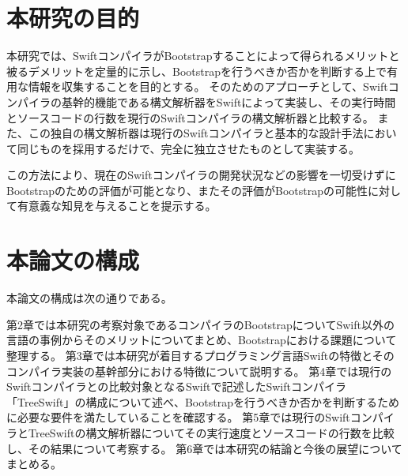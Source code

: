 \section{本研究の目的}
\label{introduction:purpose}

本研究では、SwiftコンパイラがBootstrapすることによって得られるメリットと被るデメリットを定量的に示し、Bootstrapを行うべきか否かを判断する上で有用な情報を収集することを目的とする。
そのためのアプローチとして、Swiftコンパイラの基幹的機能である構文解析器をSwiftによって実装し、その実行時間とソースコードの行数を現行のSwiftコンパイラの構文解析器と比較する。
また、この独自の構文解析器は現行のSwiftコンパイラと基本的な設計手法において同じものを採用するだけで、完全に独立させたものとして実装する。

この方法により、現在のSwiftコンパイラの開発状況などの影響を一切受けずにBootstrapのための評価が可能となり、またその評価がBootstrapの可能性に対して有意義な知見を与えることを提示する。


\section{本論文の構成}

本論文の構成は次の通りである。

第2章では本研究の考察対象であるコンパイラのBootstrapについてSwift以外の言語の事例からそのメリットについてまとめ、Bootstrapにおける課題について整理する。
第3章では本研究が着目するプログラミング言語Swiftの特徴とそのコンパイラ実装の基幹部分における特徴について説明する。
第4章では現行のSwiftコンパイラとの比較対象となるSwiftで記述したSwiftコンパイラ「TreeSwift」の構成について述べ、Bootstrapを行うべきか否かを判断するために必要な要件を満たしていることを確認する。
第5章では現行のSwiftコンパイラとTreeSwiftの構文解析器についてその実行速度とソースコードの行数を比較し、その結果について考察する。
第6章では本研究の結論と今後の展望についてまとめる。


